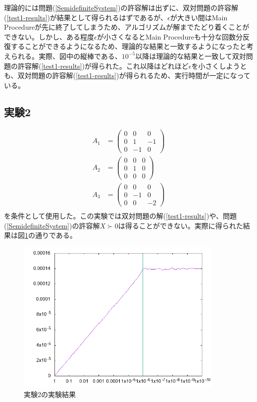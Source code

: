 理論的には問題(\ref{SemidefiniteSystem})の許容解は出ずに、双対問題の許容解(\ref{test1-results})が結果として得られるはずであるが、$\epsilon$が大きい間はMain Procedureが先に終了してしまうため、アルゴリズムが解までたどり着くことができない。しかし、ある程度$\epsilon$が小さくなるとMain Procedureも十分な回数分反復することができるようになるため、理論的な結果と一致するようになったと考えられる。実際、図中の縦棒である、$10^{-5}$以降は理論的な結果と一致して双対問題の許容解(\ref{test1-results})が得られた。これ以降はどれほど$\epsilon$を小さくしようとも、双対問題の許容解(\ref{test1-results})が得られるため、実行時間が一定になっている。

\subsection{実験2}
\begin{align*}
  A_1 & = \left(
            \begin{array}{ccc}
              0 &  0 &  0 \\
              0 &  1 & -1 \\
              0 & -1 &  0
            \end{array}
          \right) \\
  A_2 & = \left(
            \begin{array}{ccc}
              0 & 0 & 0 \\
              0 & 1 & 0 \\
              0 & 0 & 0
            \end{array}
          \right) \\
  A_3 & = \left(
            \begin{array}{ccc}
              0 &  0 &  0 \\
              0 & -1 &  0 \\
              0 &  0 & -2
            \end{array}
          \right) \\
\end{align*}
を条件として使用した。この実験では双対問題の解(\ref{test1-results})や、問題(\ref{SemidefiniteSystem})の許容解$X \succ 0$は得ることができない。実際に得られた結果は図\ref{test2}の通りである。
\begin{figure}
  \centering
  \includegraphics[width=10cm]{test2.png}
  \caption{実験2の実験結果}
  \label{test2}
\end{figure}

